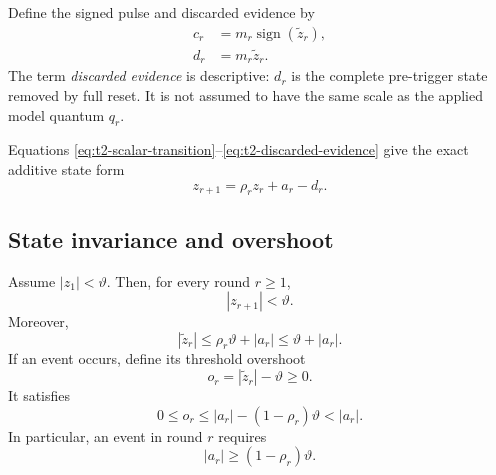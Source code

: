 Define the signed pulse and discarded evidence by
\begin{align}
    c_r
    &=
    m_r\operatorname{sign}(\widetilde z_r),
    \label{eq:t2-scalar-pulse}\\
    d_r
    &=
    m_r\widetilde z_r.
    \label{eq:t2-discarded-evidence}
\end{align}
The term \emph{discarded evidence} is descriptive: $d_r$ is the complete pre-trigger state removed by full reset. It is not assumed to have the same scale as the applied model quantum $q_r$.

Equations \eqref{eq:t2-scalar-transition}--\eqref{eq:t2-discarded-evidence} give the exact additive state form
\begin{equation}
    z_{r+1}
    =
    \rho_r z_r+a_r-d_r.
    \label{eq:t2-additive-state}
\end{equation}

\subsection{State invariance and overshoot}

\begin{proposition}
\label{prop:t2-state-overshoot}
Assume $|z_1|<\vartheta$. Then, for every round $r\geq1$,
\begin{equation}
    |z_{r+1}|<\vartheta.
    \label{eq:t2-state-invariant}
\end{equation}
Moreover,
\begin{equation}
    |\widetilde z_r|
    \leq
    \rho_r\vartheta+|a_r|
    \leq
    \vartheta+|a_r|.
    \label{eq:t2-pretrigger-bound}
\end{equation}
If an event occurs, define its threshold overshoot
\begin{equation}
    o_r=|\widetilde z_r|-\vartheta\geq0.
\end{equation}
It satisfies
\begin{equation}
    0\leq o_r
    \leq
    |a_r|-(1-\rho_r)\vartheta
    < |a_r|.
    \label{eq:t2-overshoot-bound}
\end{equation}
In particular, an event in round $r$ requires
\begin{equation}
    |a_r|\geq(1-\rho_r)\vartheta.
    \label{eq:t2-event-necessary-input}
\end{equation}
\end{proposition}

